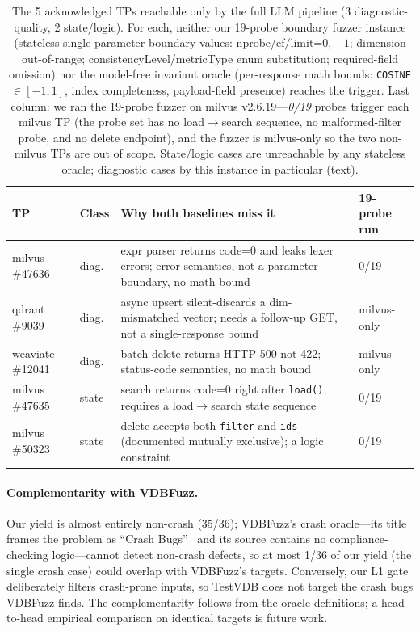 \documentclass[sigconf]{acmart}
\begin{document}
\begin{table}[t]
\caption{The 5 acknowledged TPs reachable only by the full LLM pipeline (3 diagnostic-quality, 2 state/logic). For each, neither our 19-probe boundary fuzzer instance (stateless single-parameter boundary values: nprobe/ef/limit=0, $-1$; dimension out-of-range; consistencyLevel/metricType enum substitution; required-field omission) nor the model-free invariant oracle (per-response math bounds: \texttt{COSINE}$\in[-1,1]$, index completeness, payload-field presence) reaches the trigger. Last column: we ran the 19-probe fuzzer on milvus v2.6.19---\emph{0/19} probes trigger each milvus TP (the probe set has no load$\to$search sequence, no malformed-filter probe, and no delete endpoint), and the fuzzer is milvus-only so the two non-milvus TPs are out of scope. State/logic cases are unreachable by any stateless oracle; diagnostic cases by this instance in particular (text).}
\label{tab:incremental}
\small
\begin{tabular}{@{}llp{}p{}@{}}
\toprule
TP & Class & Why both baselines miss it & 19-probe run \\
\midrule
milvus \#47636 & diag. & expr parser returns code=0 and leaks lexer errors; error-semantics, not a parameter boundary, no math bound & 0/19 \\
qdrant \#9039 & diag. & async upsert silent-discards a dim-mismatched vector; needs a follow-up GET, not a single-response bound & milvus-only \\
weaviate \#12041 & diag. & batch delete returns HTTP 500 not 422; status-code semantics, no math bound & milvus-only \\
milvus \#47635 & state & search returns code=0 right after \texttt{load()}; requires a load$\to$search state sequence & 0/19 \\
milvus \#50323 & state & delete accepts both \texttt{filter} and \texttt{ids} (documented mutually exclusive); a logic constraint & 0/19 \\
\bottomrule
\end{tabular}
\end{table}

\paragraph{Complementarity with VDBFuzz.} Our yield is almost entirely non-crash (35/36); VDBFuzz's crash oracle---its title frames the problem as ``Crash Bugs''~\cite{vdbfuzz26} and its source contains no compliance-checking logic---cannot detect non-crash defects, so at most 1/36 of our yield (the single crash case) could overlap with VDBFuzz's targets. Conversely, our L1 gate deliberately filters crash-prone inputs, so TestVDB does not target the crash bugs VDBFuzz finds. The complementarity follows from the oracle definitions; a head-to-head empirical comparison on identical targets is future work.
\end{document}

